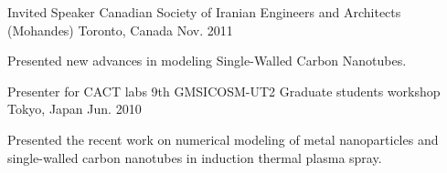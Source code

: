 


\begin{cventries}


\cventry
{Invited Speaker} %
{Canadian Society of Iranian Engineers and Architects (Mohandes)} %
{Toronto, Canada} %
{Nov. 2011} %
{ %
\begin{cvitems}
\item {Presented new advances in modeling Single-Walled Carbon Nanotubes.}
\end{cvitems}
}


\cventry
{Presenter for  CACT labs} %
{9th GMSICOSM-UT2 Graduate students workshop} %
{Tokyo, Japan} %
{Jun. 2010} %
{ %
\begin{cvitems}
\item {Presented the recent work on numerical modeling of metal nanoparticles and single-walled carbon nanotubes in induction thermal plasma spray.}
\end{cvitems}
}



\end{cventries}